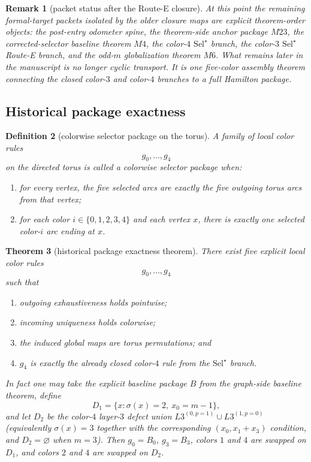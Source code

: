 \documentclass[11pt]{article}
\newtheorem{theorem}{Theorem}[section]
\newtheorem{remark}[theorem]{Remark}
\newtheorem{definition}[theorem]{Definition}
\newcommand{\SelStar}{\mathrm{Sel}^{\star}}
\begin{document}
\begin{remark}[packet status after the Route-E closure]
At this point the remaining formal-target packets isolated by the older
closure maps are explicit theorem-order objects:
the post-entry odometer spine, the theorem-side anchor package \(M23\), the
corrected-selector baseline theorem \(M4\), the color-$4$ \(\SelStar\) branch,
the color-$3$ \(\SelStar\) Route-E branch, and the odd-$m$ globalization
theorem \(M6\).
What remains later in the manuscript is no longer cyclic transport.
It is one five-color assembly theorem connecting the closed color-$3$ and
color-$4$ branches to a full Hamilton package.
\end{remark}

\subsection{Historical package exactness}

\begin{definition}[colorwise selector package on the torus]
A family of local color rules
\[
g_0,\dots,g_4
\]
on the directed torus is called a \emph{colorwise selector package} when:
\begin{enumerate}[label=\textup{(\arabic*)},leftmargin=2.8em]
\item for every vertex, the five selected arcs are exactly the five outgoing
      torus arcs from that vertex;
\item for each color $i\in\{0,1,2,3,4\}$ and each vertex $x$, there is exactly
      one selected color-$i$ arc ending at $x$.
\end{enumerate}
\end{definition}

\begin{theorem}[historical package exactness theorem]
\label{thm:G1-historical}
There exist five explicit local color rules
\[
g_0,\dots,g_4
\]
such that
\begin{enumerate}[label=\textup{(\arabic*)},leftmargin=2.8em]
\item outgoing exhaustiveness holds pointwise;
\item incoming uniqueness holds colorwise;
\item the induced global maps are torus permutations; and
\item \(g_4\) is exactly the already closed color-$4$ rule from the
      \(\SelStar\) branch.
\end{enumerate}
In fact one may take the explicit baseline package \(B\) from the graph-side
baseline theorem, define
\[
D_1=\{x:\sigma(x)=2,\ x_0=m-1\},
\]
and let \(D_2\) be the color-$4$ layer-$3$ defect union
\(L3^{(0,p=1)}\cup L3^{(1,p=0)}\) (equivalently
\(\sigma(x)=3\) together with the corresponding \((x_0,x_1+x_3)\) condition,
and \(D_2=\varnothing\) when \(m=3\)).
Then \(g_0=B_0\), \(g_3=B_3\), colors \(1\) and \(4\) are swapped on \(D_1\),
and colors \(2\) and \(4\) are swapped on \(D_2\).
\end{theorem}
\end{document}
